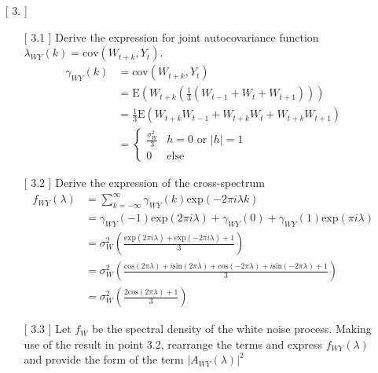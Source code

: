 \documentclass[10pt,a4paper]{article}
\begin{document}
\begin{enumerate}
	\item[[ 3.]] 
	\begin{enumerate}
		\item[[ 3.1]] Derive the expression for joint autocovariance function $\lambda_{WY}(k) = \text{cov}(W_{t+k},Y_t)$.
		\begin{align*}
			\gamma_{WY}(k) &= \text{cov}(W_{t+k},Y_t) \\
			&= \text{E}(W_{t+k}(\frac{1}{3}(W_{t-1}+W_{t}+W_{t+1}))) \\
			&= \frac{1}{3} \text{E}(W_{t+k}W_{t-1}+W_{t+k}W_{t}+W_{t+k}W_{t+1}) \\
			&=  	\left\{
			\begin{array}{ll}
				\frac{\sigma_{W}^2}{3} & h=0 \text{  or  } |h| = 1\\
				0 & \text{else}
			\end{array}
			\right.
		\end{align*}
		\item[[ 3.2]] Derive the expression of the cross-spectrum
		\begin{align*}
			f_{WY}(\lambda) &= \sum_{k=-\infty}^{\infty} \gamma_{WY}(k) \text{exp}(-2\pi i \lambda k) \\
			&= \gamma_{WY}(-1) \text{exp}(2\pi i \lambda) + \gamma_{WY}(0) + \gamma_{WY}(1) \text{exp}(\pi i \lambda) \\
			&= \sigma_{W}^2 \left( \frac{\text{exp}(2\pi i \lambda) + \text{exp}(-2\pi i \lambda) + 1}{3}\right) \\
			&= \sigma_{W}^2 \left( \frac{\text{cos}(2\pi \lambda) + i\text{sin}(2\pi \lambda) +\text{cos}(-2\pi \lambda) + i\text{sin}(-2\pi \lambda) + 1}{3}\right) \\
			&= \sigma_{W}^2 \left( \frac{2\text{cos}(2\pi \lambda) + 1}{3}\right)
		\end{align*}
		\item[[ 3.3]] Let $f_W$ be the spectral density of the white noise process. Making use of the result in point 3.2, rearrange the terms and express $f_{WY}(\lambda)$ and provide the form of the term $|A_{WY}(\lambda)|^2$
		

\end{enumerate}
\end{enumerate}
\end{document}
